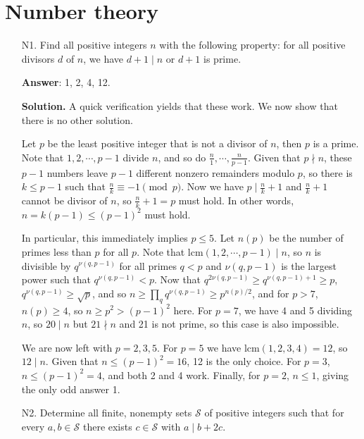 \documentclass[11pt,a4paper]{article}
\begin{document}
    \section*{Number theory}
    \begin{enumerate}
    	\item [N1.]
    	Find all positive integers $n$ with the following property: for all positive divisors $d$ of $n$, we have $d+1\mid n$ or $d+1$ is prime.
    	
    	\textbf{Answer}: 1, 2, 4, 12. 
    	
    	\textbf{Solution.} A quick verification yields that these work. 
    	We now show that there is no other solution. 
    	
    	Let $p$ be the least positive integer that is not a divisor of $n$, 
    	then $p$ is a prime. 
    	Note that $1, 2, \cdots, p - 1$ divide $n$, 
    	and so do $\frac{n}{1}, \cdots, \frac{n}{p - 1}$. 
    	Given that $p\nmid n$, these $p - 1$ numbers leave $p - 1$ different nonzero remainders modulo $p$, 
    	so there is $k\le p - 1$ such that $\frac{n}{k}\equiv -1\pmod{p}$. 
    	Now we have $p\mid \frac{n}{k} + 1$ and $\frac{n}{k} + 1$ cannot be divisor of $n$, 
    	so $\frac{n}{k} + 1 = p$ must hold. 
    	In other words, $n = k(p - 1)\le (p - 1)^2$ must hold. 
    	
    	In particular, this immediately implies $p\le 5$. 
    	Let $n(p)$ be the number of primes less than $p$ for all $p$. 
    	Note that $\text{lcm}(1, 2, \cdots, p - 1)\mid n$, so $n$ is divisible by $q^{\nu(q, p - 1)}$ for 
    	all primes $q < p$ and $\nu(q, p - 1)$ is the largest power such that $q^{\nu(q, p - 1)} < p$. 
    	Now that $q^{2\nu(q, p - 1)} \ge q^{\nu(q, p - 1) + 1} \ge p$, 
    	$q^{\nu(q, p - 1)}\ge \sqrt{p}$, 
    	and so $n\ge \prod_{q}q^{\nu(q, p - 1)}\ge p^{n(p)/2}$, 
    	and for $p > 7$, $n(p)\ge 4$, so $n \ge p^2 > (p - 1)^2$ here. 
    	For $p = 7$, we have 4 and 5 dividing $n$, so $20\mid n$ but $21\nmid n$ and 21 is not prime, so this case is also impossible. 
    	
    	We are now left with $p = 2, 3, 5$. 
    	For $p = 5$ we have $\text{lcm}(1, 2, 3, 4) = 12$, so $12\mid n$. 
    	Given that $n\le (p - 1)^2 = 16$, 12 is the only choice. 
    	For $p = 3$, $n\le (p - 1)^2 = 4$, and both 2 and 4 work. 
    	Finally, for $p = 2$, $n\le 1$, giving the only odd answer 1. 
    	
    	\item [N2.]
    	Determine all finite, nonempty sets $\mathcal{S}$ of positive integers such that for every $a,b\in\mathcal{S}$ there exists $c\in\mathcal{S}$ with $a\mid b+2c$.
    	

\end{enumerate}
\end{document}
